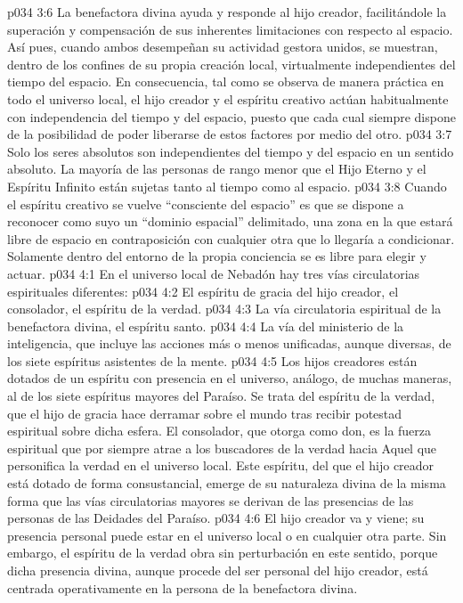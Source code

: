 \vs p034 3:6 La benefactora divina ayuda y responde al hijo creador, facilitándole la superación y compensación de sus inherentes limitaciones con respecto al espacio. Así pues, cuando ambos desempeñan su actividad gestora unidos, se muestran, dentro de los confines de su propia creación local, virtualmente independientes del tiempo  del espacio. En consecuencia, tal como se observa de manera práctica en todo el universo local, el hijo creador y el espíritu creativo actúan habitualmente con independencia del tiempo y del espacio, puesto que cada cual siempre dispone de la posibilidad de poder liberarse de estos factores por medio del otro.
\vs p034 3:7 \pc Solo los seres absolutos son independientes del tiempo y del espacio en un sentido absoluto. La mayoría de las personas de rango menor que el Hijo Eterno y el Espíritu Infinito están sujetas tanto al tiempo como al espacio.
\vs p034 3:8 Cuando el espíritu creativo se vuelve “consciente del espacio” es que se dispone a reconocer como suyo un “dominio espacial” delimitado, una zona en la que estará libre de espacio en contraposición con cualquier otra que lo llegaría a condicionar. Solamente dentro del entorno de la propia conciencia se es libre para elegir y actuar.
\vs p034 4:1 En el universo local de Nebadón hay tres vías circulatorias espirituales diferentes:
\vs p034 4:2 El espíritu de gracia del hijo creador, el consolador, el espíritu de la verdad.
\vs p034 4:3 La vía circulatoria espiritual de la benefactora divina, el espíritu santo.
\vs p034 4:4 La vía del ministerio de la inteligencia, que incluye las acciones más o menos unificadas, aunque diversas, de los siete espíritus asistentes de la mente.
\vs p034 4:5 \pc Los hijos creadores están dotados de un espíritu con presencia en el universo, análogo, de muchas maneras, al de los siete espíritus mayores del Paraíso. Se trata del espíritu de la verdad, que el hijo de gracia hace derramar sobre el mundo tras recibir potestad espiritual sobre dicha esfera. El consolador, que otorga como don, es la fuerza espiritual que por siempre atrae a los buscadores de la verdad hacia Aquel que personifica la verdad en el universo local. Este espíritu, del que el hijo creador está dotado de forma consustancial, emerge de su naturaleza divina de la misma forma que las vías circulatorias mayores se derivan de las presencias de las personas de las Deidades del Paraíso.
\vs p034 4:6 El hijo creador va y viene; su presencia personal puede estar en el universo local o en cualquier otra parte. Sin embargo, el espíritu de la verdad obra sin perturbación en este sentido, porque dicha presencia divina, aunque procede del ser personal del hijo creador, está centrada operativamente en la persona de la benefactora divina.

